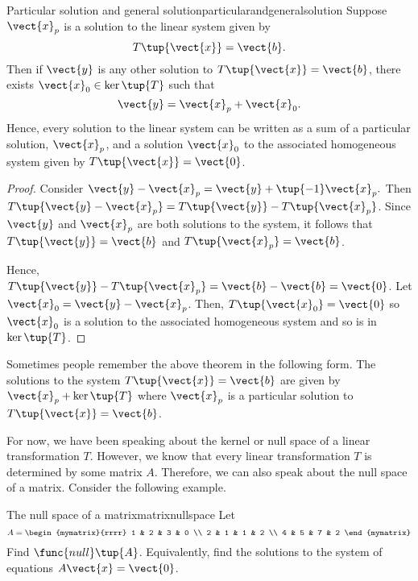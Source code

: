 \begin{theorem}{Particular solution and general solution}{particularandgeneralsolution}
Suppose $\vect{x}_{p}$ is a solution to the linear system given by
\begin{equation*}
T\tup{\vect{x} } = \vect{b}.
\end{equation*}
Then if $\vect{y}$ is any other solution to $T\tup{\vect{x}}=\vect{b}$, 
 there exists $\vect{x}_0 \in \ker
\tup{T} $ such that
\begin{equation*}
\vect{y} = \vect{x}_{p}+ \vect{x}_0.
\end{equation*}
Hence, every solution to the linear system can be written as a sum of a particular solution, $\vect{x}_p$,
 and a solution $\vect{x}_0$ to the associated 
homogeneous system given by $T\tup{\vect{x}}=\vect{0}$.
\end{theorem}

\begin{proof}
Consider $\vect{y} - \vect{x}_{p}= \vect{y} + \tup{
-1} \vect{x}_{p}.$ Then $T\tup{\vect{y} - \vect{x}_{p}} =T\tup{\vect{y}}
-T\tup{\vect{x}_{p} }$. Since $\vect{y}$ and $\vect{x}_{p}$ are both solutions to the system, it follows that $T\tup{\vect{y}}= \vect{b} $
and $T\tup{\vect{x}_p} = \vect{b}$. 

Hence, $T\tup{\vect{y}}-T\tup{\vect{x}_{p} }
=\vect{b} - \vect{b} = \vect{0}$.  Let $\vect{x}_0 = \vect{y} - \vect{x}_{p}$.
Then, $T\tup{\vect{x}_0}= \vect{0} $ so $\vect{x}_0$ is a solution to the associated homogeneous system and so is in $\ker \tup{T}$.
\end{proof}

Sometimes people remember the above theorem in the following form. The
solutions to the system $T\tup{\vect{x}}=\vect{b}$ are given by 
$\vect{x}_{p}+\ker \tup{T} $ where $\vect{x}_{p}$ is a particular
solution to $T\tup{\vect{x}}=\vect{b}$.

For now, we have been speaking about the kernel or null space of a linear transformation $T$. However, 
we know that every linear transformation $T$ is determined by some matrix $A$. Therefore,
we can also speak about the null space of a matrix. Consider the following example.  

\begin{example}{The null space of a matrix}{matrixnullspace}
Let
\begin{equation*}
A=\begin{mymatrix}{rrrr}
1 & 2 & 3 & 0 \\
2 & 1 & 1 & 2 \\
4 & 5 & 7 & 2
\end{mymatrix}
\end{equation*}
Find $\func{null} \tup{A} $. Equivalently, find the solutions to the
system of equations $A\vect{x}=\vect{0}$.
\end{example}


